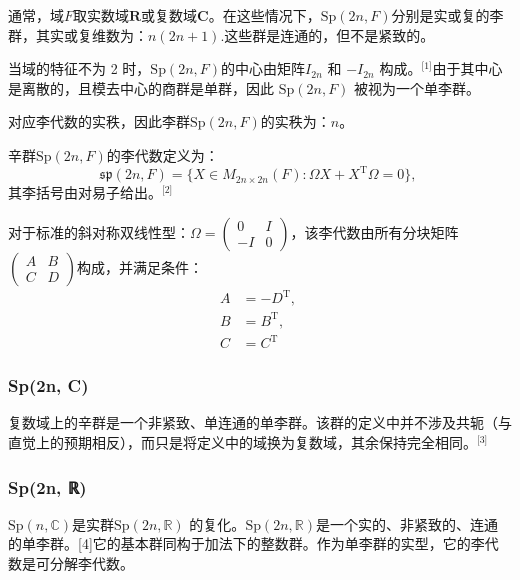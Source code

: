 通常，域$F$取实数域$\mathbf{R}$或复数域$\mathbf{C}$。在这些情况下，$\mathrm{Sp}(2n, F)$分别是实或复的李群，其实或复维数为：$n(2n+1)$.这些群是连通的，但不是紧致的。

当域的特征不为 2 时，$\mathrm{Sp}(2n, F)$的中心由矩阵$I_{2n}$ 和 $-I_{2n}$ 构成。\(^\text{[1]}\)由于其中心是离散的，且模去中心的商群是单群，因此 $\mathrm{Sp}(2n, F)$ 被视为一个单李群。

对应李代数的实秩，因此李群$\mathrm{Sp}(2n, F)$的实秩为：$n$。

辛群$\mathrm{Sp}(2n, F)$的李代数定义为：
$$
\mathfrak{sp}(2n,F) = \{ X \in M_{2n \times 2n}(F) : \Omega X + X^{\mathrm{T}} \Omega = 0 \},~
$$
其李括号由对易子给出。\(^\text{[2]}\)

对于标准的斜对称双线性型：$\Omega = \begin{pmatrix}0 & I \\- I & 0
\end{pmatrix}$，该李代数由所有分块矩阵$\begin{pmatrix}A & B \\C & D
\end{pmatrix}$构成，并满足条件：
$$
\begin{aligned}
A &= - D^{\mathrm{T}}, \\
B &= B^{\mathrm{T}}, \\
C &= C^{\mathrm{T}}
\end{aligned}~
$$
\subsubsection{Sp(2n, C)}
复数域上的辛群是一个非紧致、单连通的单李群。该群的定义中并不涉及共轭（与直觉上的预期相反），而只是将定义中的域换为复数域，其余保持完全相同。\(^\text{[3]}\)
\subsubsection{Sp(2n, ℝ)}
$\mathrm{Sp}(n, \mathbb{C})$是实群$\mathrm{Sp}(2n, \mathbb{R})$ 的复化。$\mathrm{Sp}(2n, \mathbb{R})$是一个实的、非紧致的、连通的单李群。[4]它的基本群同构于加法下的整数群。作为单李群的实型，它的李代数是可分解李代数。

